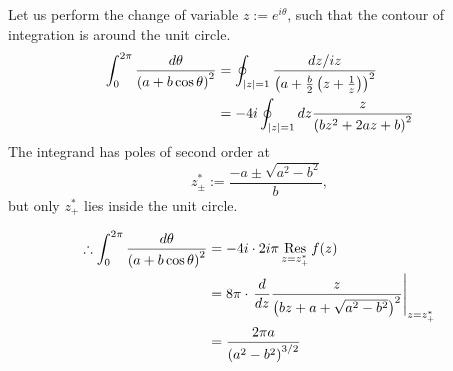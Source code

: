 \item

Let us perform the change of variable $z := e^{i\theta}$,
such that the contour of integration is around the unit circle.
\begin{align*}
    \int_0^{2\pi} \frac{d\theta}{{\left( a + b\cos\theta \right)}^2}
    &= \oint_{\left| z \right| = 1} \frac{dz / iz}{{\left( a + \frac{b}{2}\left( z + \frac{1}{z} \right) \right)}^2} \\
    &= -4i \oint_{\left| z \right| = 1} dz \frac{z}{{\left( bz^2 + 2az + b \right)}^2}
\end{align*}
The integrand has poles of second order at
\[
    z_\pm^* := \frac{-a \pm \sqrt{a^2 - b^2}}{b},
\]
but only $z_+^*$ lies inside the unit circle.

\begin{align*}
    \therefore \int_0^{2\pi} \frac{d\theta}{{\left( a + b\cos\theta \right)}^2}
    &= -4i \cdot 2i\pi \mathop{\mathrm{Res}}_{z = z_+^*} f(z) \\
    &= 8\pi \cdot {\left. \frac{d}{dz} \frac{z}{{\left( bz + a + \sqrt{a^2 - b^2} \right)}^2} \right|}_{z = z_+^*} \\
    &= \frac{2\pi a}{{\left( a^2 - b^2 \right)}^{3/2}}
\end{align*}